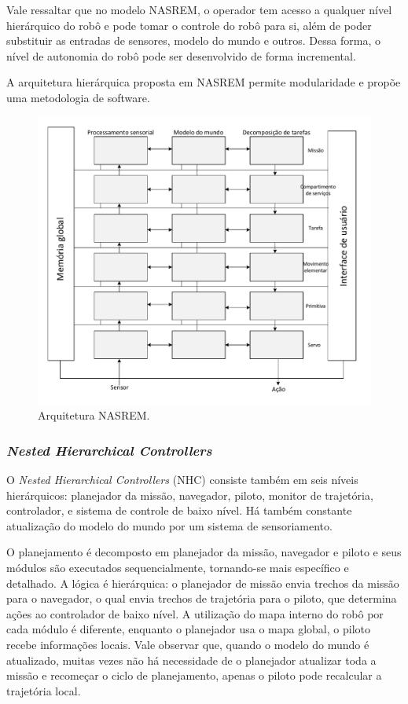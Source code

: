 Vale ressaltar que no modelo NASREM, o operador tem acesso a qualquer nível
hierárquico do robô e pode tomar o controle do robô para si, além de poder
substituir as entradas de sensores, modelo do mundo e outros. Dessa forma, o
nível de autonomia do robô pode ser desenvolvido de forma incremental.

A arquitetura hierárquica proposta em NASREM permite modularidade e propõe uma
metodologia de software.  
 
\begin{figure}[H]
\centering
\includegraphics[width=1\columnwidth]{figs/NASREM.pdf}
\caption{Arquitetura NASREM.}
\label{nasrem}
\end{figure}

\subsubsection{\textit{Nested Hierarchical Controllers}}
O \textit{Nested Hierarchical Controllers} (NHC) consiste também em seis
níveis hierárquicos: planejador da missão, navegador, piloto, monitor de
trajetória, controlador, e sistema de controle de baixo nível. Há também
constante atualização do modelo do mundo por um sistema de sensoriamento.

O planejamento é decomposto em planejador da missão, navegador e piloto e seus
módulos são executados sequencialmente, tornando-se mais específico e detalhado.
A lógica é hierárquica: o planejador de missão envia trechos da missão para o
navegador, o qual envia trechos de trajetória para o piloto, que determina ações
ao controlador de baixo nível. A utilização do mapa interno do robô por cada
módulo é diferente, enquanto o planejador usa o mapa global, o piloto recebe
informações locais. Vale observar que, quando o modelo do mundo é atualizado,
muitas vezes não há necessidade de o planejador atualizar toda a missão e
recomeçar o ciclo de planejamento, apenas o piloto pode recalcular a trajetória
local. 

